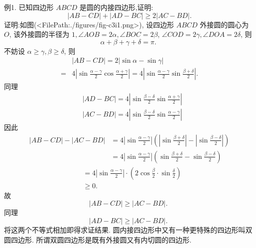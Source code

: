 例1. 已知四边形 $A B C D$ 是圆的内接四边形,证明:
$$
|A B-C D|+|A D-B C| \geqslant 2|A C-B D| .
$$
证明:如图(<FilePath:./figures/fig-c3i1.png>), 设四边形 $A B C D$ 外接圆的圆心为 $O$, 该外接圆的半径为 $1, \angle A O B=2 \alpha, \angle B O C=2 \beta$, $\angle C O D=2 \gamma, \angle D O A=2 \delta$, 则
$$
\alpha+\beta+\gamma+\delta=\pi \text {. }
$$
不妨设 $\alpha \geqslant \gamma, \beta \geqslant \delta$, 则
$$
\begin{aligned}
& |A B-C D|=2|\sin \alpha-\sin \gamma| \\
= & 4\left|\sin \frac{\alpha-\gamma}{2} \cos \frac{\alpha+\gamma}{2}\right|=4\left|\sin \frac{\alpha-\gamma}{2} \sin \frac{\beta+\delta}{2}\right| .
\end{aligned}
$$
同理
$$
\begin{aligned}
& |A D-B C|=4\left|\sin \frac{\beta-\delta}{2} \sin \frac{\alpha+\gamma}{2}\right| \\
& |A C-B D|=4\left|\sin \frac{\beta-\delta}{2} \sin \frac{\alpha-\gamma}{2}\right|
\end{aligned}
$$
因此
$$
\begin{aligned}
|A B-C D|-|A C-B D| & =4\left|\sin \frac{\alpha-\gamma}{2}\right|\left(\left|\sin \frac{\beta+\delta}{2}\right|-\left|\sin \frac{\beta-\delta}{2}\right|\right) \\
& =4\left|\sin \frac{\alpha-\gamma}{2}\right|\left(\sin \frac{\beta+\delta}{2}-\sin \frac{\beta-\delta}{2}\right)
\end{aligned}
$$
$$
\begin{aligned}
& =4\left|\sin \frac{\alpha-\gamma}{2}\right| \cdot\left(2 \cos \frac{\beta}{2} \cdot \sin \frac{\delta}{2}\right) \\
& \geqslant 0 .
\end{aligned}
$$
故
$$
|A B-C D| \geqslant|A C-B D| \text {. }
$$
同理
$$
|A D-B C| \geqslant|A C-B D| \text {. }
$$
将这两个不等式相加即得求证结果.
圆内接四边形中又有一种更特殊的四边形叫双圆四边形.
所谓双圆四边形是既有外接圆又有内切圆的四边形.



